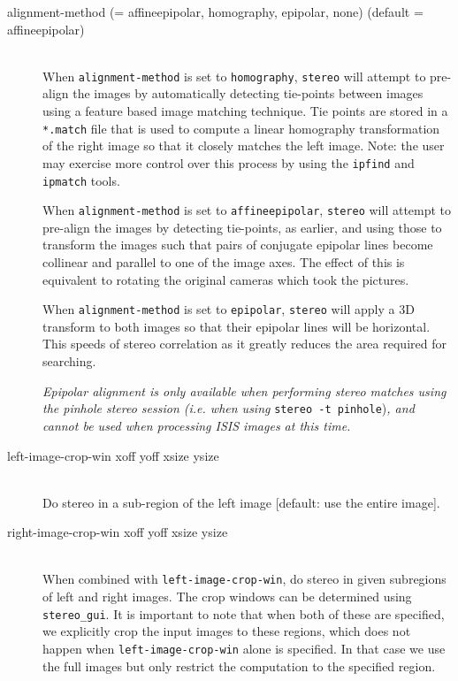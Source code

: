 \begin{description}

\item[alignment-method \textnormal{\small{(= affineepipolar, homography,
      epipolar, none)}} (default = affineepipolar)] \hfill \\

  When \texttt{alignment-method} is set to \texttt{homography},
  \texttt{stereo} will attempt to pre-align the images by
  automatically detecting tie-points between images using a feature
  based image matching technique. Tie points are stored in a
  \texttt{*.match} file that is used to compute a linear homography
  transformation of the right image so that it closely matches the
  left image.  Note: the user may exercise more control over this
  process by using the \texttt{ipfind} and \texttt{ipmatch} tools.

  When \texttt{alignment-method} is set to \texttt{affineepipolar},
  \texttt{stereo} will attempt to pre-align the images by detecting
  tie-points, as earlier, and using those to transform the images such
  that pairs of conjugate epipolar lines become collinear and parallel to
  one of the image axes.  The effect of this is equivalent to rotating the
  original cameras which took the pictures.

  When \texttt{alignment-method} is set to \texttt{epipolar},
  \texttt{stereo} will apply a 3D transform to both images so that
  their epipolar lines will be horizontal. This speeds of stereo
  correlation as it greatly reduces the area required for searching.

  {\em Epipolar alignment is only available when performing stereo
    matches using the pinhole stereo session (i.e. when using}
  \texttt{stereo -t pinhole}){\em, and cannot be used when processing
    ISIS images at this time.}

\item[left-image-crop-win \textnormal xoff yoff xsize ysize] \hfill \\
Do stereo in a sub-region of the left image [default: use the entire image].

\item[right-image-crop-win \textnormal xoff yoff xsize ysize] \hfill \\
When combined with \texttt{left-image-crop-win}, do stereo in given subregions
of left and right images. The crop windows can be determined using \texttt{stereo\_gui}.
It is important to note that when both of these
are specified, we explicitly crop the input images to these regions,
which does not happen when \texttt{left-image-crop-win} alone is specified.
In that case we use the full images but only restrict the computation
to the specified region. 


\end{description}
